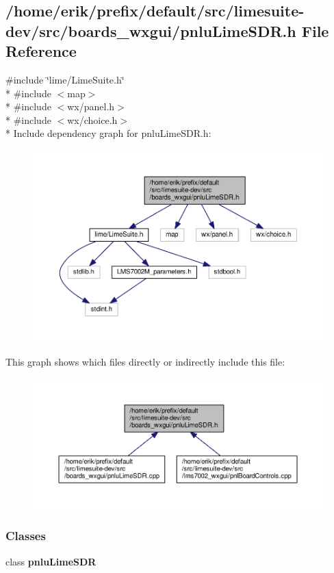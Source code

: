 \subsection{/home/erik/prefix/default/src/limesuite-\/dev/src/boards\+\_\+wxgui/pnlu\+Lime\+S\+DR.h File Reference}
\label{pnluLimeSDR_8h}
{\ttfamily \#include \char`\"{}lime/\+Lime\+Suite.\+h\char`\"{}}\\*
{\ttfamily \#include $<$map$>$}\\*
{\ttfamily \#include $<$wx/panel.\+h$>$}\\*
{\ttfamily \#include $<$wx/choice.\+h$>$}\\*
Include dependency graph for pnlu\+Lime\+S\+D\+R.\+h\+:
\nopagebreak
\begin{figure}[H]
\begin{center}
\leavevmode
\includegraphics[width=350pt]{d9/d39/pnluLimeSDR_8h__incl}
\end{center}
\end{figure}
This graph shows which files directly or indirectly include this file\+:
\nopagebreak
\begin{figure}[H]
\begin{center}
\leavevmode
\includegraphics[width=350pt]{d5/d89/pnluLimeSDR_8h__dep__incl}
\end{center}
\end{figure}
\subsubsection*{Classes}
\begin{DoxyCompactItemize}
\item 
class {\bf pnlu\+Lime\+S\+DR}
\end{DoxyCompactItemize}
